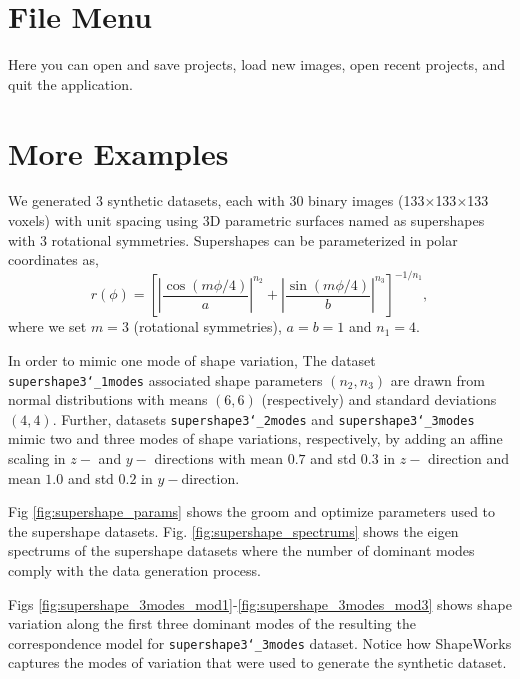 \documentclass[letterpaper,12pt]{article}   %
\begin{document}
\section{File Menu}

Here you can open and save projects, load new images, open recent projects, and quit the application.
\section{More Examples}

We generated 3 synthetic datasets, each with 30 binary images (133$\times$133$\times$133 voxels) with unit spacing using 3D parametric surfaces named as supershapes with 3 rotational symmetries. Supershapes can be parameterized in polar coordinates as, 
\begin{equation}
	r(\phi) = \left[ \left|\frac{\cos(m\phi/4)}{a} \right|^{n_2} + \left|\frac{\sin(m\phi/4)}{b} \right|^{n_3} \right]^{-1/n_1},
\end{equation}
where we set $m = 3$ (rotational symmetries), $a = b = 1$ and $n_1 = 4$. 

In order to mimic one mode of shape variation, The dataset \texttt{supershape3\char`_1modes} associated shape parameters $(n_2, n_3)$ are drawn from normal distributions with means $(6,6)$ (respectively) and standard deviations $(4,4)$. Further, datasets \texttt{supershape3\char`_2modes} and \texttt{supershape3\char`_3modes} mimic two and three modes of shape variations, respectively, by adding an affine scaling in $z-$ and $y-$ directions with mean $0.7$ and std $0.3$ in $z-$ direction and mean $1.0$ and std $0.2$ in $y-$direction.

Fig \ref{fig:supershape_params} shows the groom and optimize parameters used to the supershape datasets. Fig. \ref{fig:supershape_spectrums} shows the eigen spectrums of the supershape datasets where the number of dominant modes comply with the data generation process.

Figs \ref{fig:supershape_3modes_mod1}-\ref{fig:supershape_3modes_mod3} shows shape variation along the first three dominant modes of the resulting the correspondence model for \texttt{supershape3\char`_3modes} dataset. Notice how ShapeWorks captures the modes of variation that were used to generate the synthetic dataset.
\end{document}
